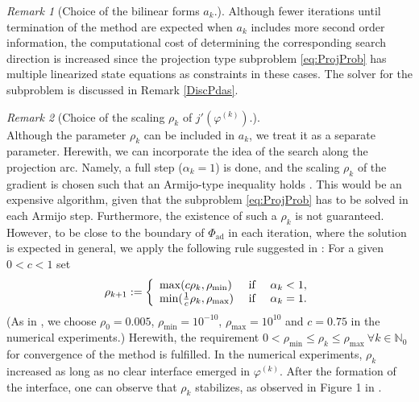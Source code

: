\documentclass[a4paper,11pt]{article}
\theoremstyle{remark}
\newtheorem{remark}{Remark}%
\newcommand{\phik}{\varphi^{(k)}}
\newcommand{\Pad}{\Phi_{\text{ad}}}
\newcommand{\N}{\mathbb{N}}
\begin{document}
\begin{remark}[Choice of the bilinear forms $a_k$.]
{Although fewer iterations until termination of the method are expected when $a_k$ includes more second order information, the computational cost of determining the corresponding search direction is increased since the projection type subproblem \eqref{eq:ProjProb} has multiple linearized state equations as constraints in these cases. 
The solver for the subproblem is discussed in Remark \ref{DiscPdas}.
}\end{remark}
\begin{remark}[Choice of the scaling $\rho_k$ of $j'(\varphi^{(k)})$.]
\label{choiceLAM}
{\rm \hfill \\
  Although the parameter $\rho_k$ can be included in $a_k$, we treat it as a separate parameter.
Herewith, we can incorporate the idea of the search along the
projection arc.
Namely, a full step ($\alpha_k=1$) is done, and the scaling $\rho_k$
of the gradient is chosen such that an Armijo-type inequality holds \cite{Bertsekas,KelleySachs1992}.
This would be an expensive algorithm, given that the subproblem \eqref{eq:ProjProb} has to be solved in each Armijo step. 
Furthermore, the existence of such a $\rho_k$
is not guaranteed.
However, to be close to the boundary of $\Pad$ in each iteration, where the solution is expected in general, we apply the following rule suggested in \cite{BFGRS14,VMPT}:
For a given $0<c<1$ set
\begin{align}\label{lambdaRule}
\rho_{k+1} :=
\left\{
\begin{array}{l c l }
\max (c \rho_k, \rho_{\min})&\text { if } &
\alpha_k<1,\\
\min (\frac{1}{c} \rho_k, \rho_{\max})&\text { if } & \alpha_k=1.
\end{array}
\right. 
\end{align}
(As in \cite{VMPT}, we choose $\rho_0=0.005$, $\rho_{\min}=10^{-10}$,
$\rho_{\max}=10^{10}$ and $c=0.75$ in the numerical experiments.)
Herewith, the requirement $0<\rho_{\min}\leq \rho_k\leq \rho_{\max}\ \forall k\in\N_0$ for convergence of the method is fulfilled.
In the numerical experiments, $\rho_k$
increased as long as no clear interface emerged in $\phik$. 
After the formation of the interface, one can observe that $\rho_k$ stabilizes, as observed in Figure 1 in \cite{BFGRS14}.
}\end{remark}
\end{document}
